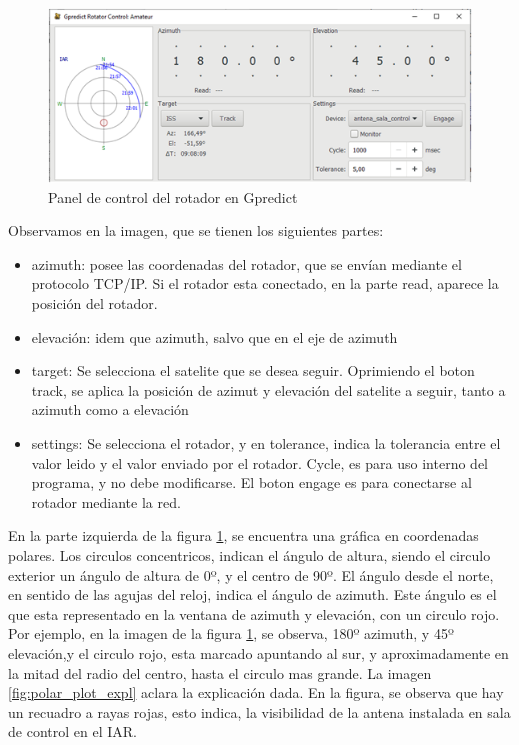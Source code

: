 \vspace{20mm}
\begin{figure}[ht]
	\includegraphics{rotador_select}
	\caption{Panel de control del rotador en Gpredict}
	\label{fig:panel_control_gpr}
\end{figure}

Observamos en la imagen, que se tienen los siguientes partes: 

\begin{itemize}	
	\item azimuth: posee las coordenadas del rotador, que se envían mediante el protocolo TCP/IP. Si el rotador esta conectado, en la parte read, aparece la posición del rotador.  
	\item elevación: idem que azimuth, salvo que en el eje de azimuth  
	\item target: Se selecciona el satelite que se desea seguir. Oprimiendo el boton track, se aplica la posición de azimut y elevación del satelite a seguir, tanto a azimuth como a elevación 
	\item settings: Se selecciona el rotador, y en tolerance, indica la tolerancia entre el valor leido y el valor enviado por el rotador. Cycle, es para uso interno del programa, y no debe modificarse. El boton engage es para conectarse al rotador mediante la red.   
\end{itemize}


En la parte izquierda de la figura \ref{fig:panel_control_gpr}, se encuentra una gráfica en coordenadas polares. Los circulos concentricos, indican el ángulo de altura, siendo el circulo exterior un ángulo de altura de 0º, y el centro de 90º. El ángulo desde el norte, en sentido de las agujas del reloj, indica el ángulo de azimuth. Este ángulo es el que esta representado en la ventana de azimuth y elevación, con un circulo rojo. Por ejemplo, en la imagen de la figura \ref{fig:panel_control_gpr}, se observa, 180º azimuth, y 45º elevación,y el circulo rojo, esta marcado apuntando al sur, y aproximadamente en la mitad del radio del centro, hasta el circulo mas grande. La imagen \ref{fig:polar_plot_expl} aclara la explicación dada. En la figura, se observa que hay un recuadro a rayas rojas, esto indica, la visibilidad de la antena instalada en sala de control en el IAR. 


